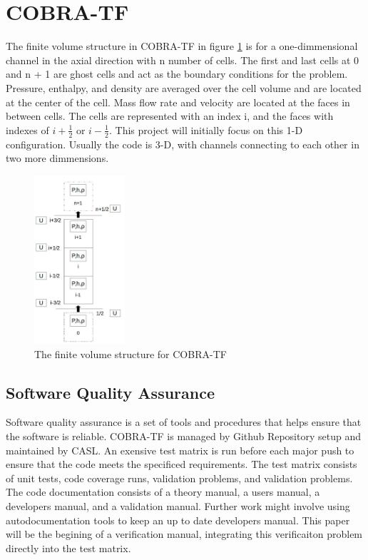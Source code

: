 \documentclass{mc2015}
\begin{document}
\section{COBRA-TF}

The finite volume structure in COBRA-TF in figure \ref{fig:CTF-Cells} is for a
one-dimmensional channel in the axial direction with n number of cells. The
first and last cells at 0 and n + 1 are ghost cells and act as the boundary
conditions for the problem. Pressure, enthalpy, and density are averaged over
the cell volume and are located at the center of the cell. Mass flow rate and
velocity are located at the faces in between cells. The cells  are represented
with an index i, and the faces with indexes of $i + \frac{1}{2}$ or 
$i-\frac{1}{2}$. This project will initially focus on this 1-D configuration.
Usually the code  is 3-D,  with channels connecting to each other in two more 
dimmensions.

\begin{figure}[!h]
	\centering
	\includegraphics[width=0.30\textwidth]{images/CTF-Cells}
	\caption{The finite volume structure for COBRA-TF}
	\label{fig:CTF-Cells}
\end{figure}

\subsection{Software Quality Assurance}

Software quality assurance is a set of tools and procedures that helps
ensure that the software is reliable. COBRA-TF is managed by Github Repository
setup and maintained by CASL. An exensive test matrix is run before each major
push to ensure that the code meets the specificed requirements. The test matrix
consists of unit tests, code coverage runs, validation problems, and validation
problems. The code documentation consists of a theory manual, a users manual, a
developers manual, and a validation manual. Further work might involve using
autodocumentation tools to keep an up to date developers manual. This paper will
be the begining of a verification manual, integrating this verificaiton problem
directly into the test matrix.
\end{document}
